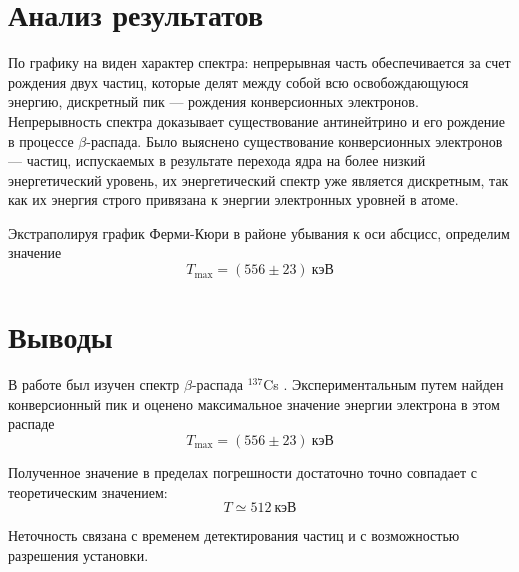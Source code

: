 \documentclass[a4paper, 12pt]{article}
\begin{document}
\section{Анализ результатов}

По графику на  виден характер спектра:
непрерывная часть обеспечивается за счет рождения двух частиц, которые
делят между собой всю освобождающуюся энергию,
дискретный пик --- рождения конверсионных электронов. Непрерывность
спектра доказывает существование антинейтрино и его рождение в
процессе $\beta$-распада. Было выяснено существование
конверсионных электронов --- частиц, испускаемых в результате перехода
ядра на более низкий энергетический уровень, их энергетический спектр
уже является дискретным, так как их энергия строго привязана к энергии
электронных уровней в атоме.

Экстраполируя график Ферми-Кюри  в районе убывания к оси абсцисс, определим
значение 
\[
    T _{\text{max}} = (556 \pm 23)\: \text{кэВ} 
\]








\section{Выводы}
В работе был изучен спектр $\beta$-распада $^{137}$Cs .
Экспериментальным путем найден конверсионный пик и оценено максимальное
значение энергии электрона в этом распаде 
\[
    T_\text{max} = (556 \pm 23)\: \text{кэВ} 
\]

Полученное значение в пределах погрешности достаточно точно совпадает
с теоретическим
значением:
\[
    T \simeq 512\: \text{кэВ}
\]

Неточность связана с временем детектирования частиц и с возможностью
разрешения 
установки.
\end{document}
